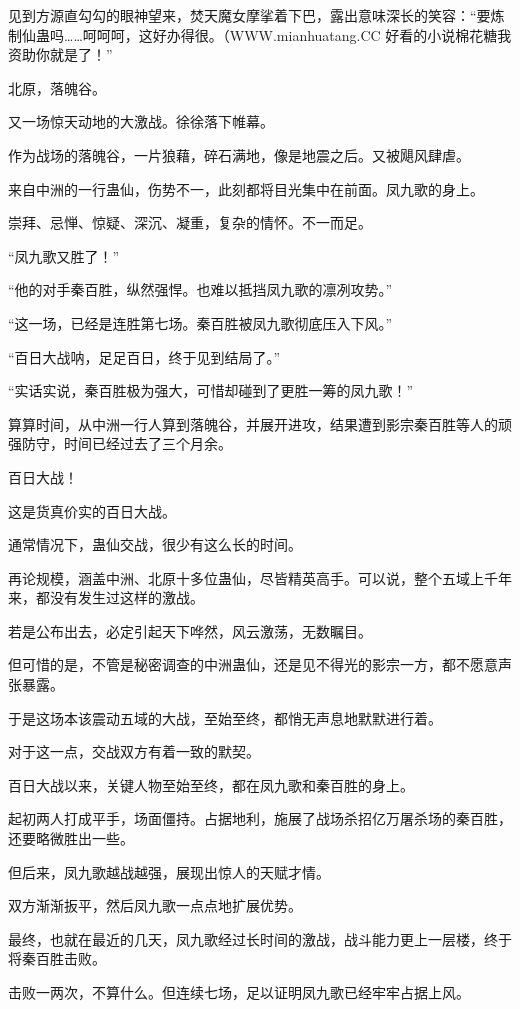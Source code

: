 \begin{this_body}
见到方源直勾勾的眼神望来，焚天魔女摩挲着下巴，露出意味深长的笑容：“要炼制仙蛊吗……呵呵呵，这好办得很。（WWW.mianhuatang.CC 好看的小说棉花糖我资助你就是了！”

北原，落魄谷。

又一场惊天动地的大激战。徐徐落下帷幕。

作为战场的落魄谷，一片狼藉，碎石满地，像是地震之后。又被飓风肆虐。

来自中洲的一行蛊仙，伤势不一，此刻都将目光集中在前面。凤九歌的身上。

崇拜、忌惮、惊疑、深沉、凝重，复杂的情怀。不一而足。

“凤九歌又胜了！”

“他的对手秦百胜，纵然强悍。也难以抵挡凤九歌的凛冽攻势。”

“这一场，已经是连胜第七场。秦百胜被凤九歌彻底压入下风。”

“百日大战呐，足足百日，终于见到结局了。”

“实话实说，秦百胜极为强大，可惜却碰到了更胜一筹的凤九歌！”

算算时间，从中洲一行人算到落魄谷，并展开进攻，结果遭到影宗秦百胜等人的顽强防守，时间已经过去了三个月余。

百日大战！

这是货真价实的百日大战。

通常情况下，蛊仙交战，很少有这么长的时间。

再论规模，涵盖中洲、北原十多位蛊仙，尽皆精英高手。可以说，整个五域上千年来，都没有发生过这样的激战。

若是公布出去，必定引起天下哗然，风云激荡，无数瞩目。

但可惜的是，不管是秘密调查的中洲蛊仙，还是见不得光的影宗一方，都不愿意声张暴露。

于是这场本该震动五域的大战，至始至终，都悄无声息地默默进行着。

对于这一点，交战双方有着一致的默契。

百日大战以来，关键人物至始至终，都在凤九歌和秦百胜的身上。

起初两人打成平手，场面僵持。占据地利，施展了战场杀招亿万屠杀场的秦百胜，还要略微胜出一些。

但后来，凤九歌越战越强，展现出惊人的天赋才情。

双方渐渐扳平，然后凤九歌一点点地扩展优势。

最终，也就在最近的几天，凤九歌经过长时间的激战，战斗能力更上一层楼，终于将秦百胜击败。

击败一两次，不算什么。但连续七场，足以证明凤九歌已经牢牢占据上风。


\end{this_body}
